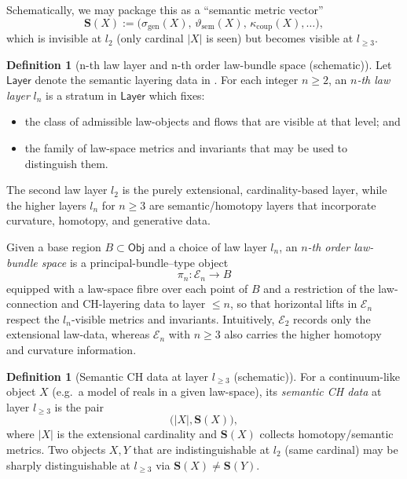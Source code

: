 \documentclass[11pt]{book}
\theoremstyle{plain}
\theoremstyle{definition}
\newtheorem{definition}[theorem]{Definition} \theoremstyle{remark}
\begin{document}
Schematically, we may package this as a “semantic metric vector”
\[
  \mathbf{S}(X)
  :=
  \bigl(
    \sigma_{\mathrm{gen}}(X),\,
    \vartheta_{\mathrm{sem}}(X),\,
    \kappa_{\mathrm{coup}}(X),\dots
  \bigr),
\]
which is invisible at $l_2$ (only cardinal $|X|$ is seen) but becomes
visible at $l_{\ge3}$.

\begin{definition}[n-th law layer and n-th order law-bundle space (schematic)]
  Let $\mathsf{Layer}$ denote the semantic layering data in \GZGMS.
  For each integer $n\ge2$, an \emph{$n$-th law layer} $l_n$ is a
  stratum in $\mathsf{Layer}$ which fixes:
  \begin{itemize}
    \item the class of admissible law-objects and flows that are
          visible at that level; and
    \item the family of law-space metrics and invariants that may be
          used to distinguish them.
  \end{itemize}
  The second law layer $l_2$ is the purely extensional,
  cardinality-based layer, while the higher layers $l_n$ for $n\ge3$
  are semantic/homotopy layers that incorporate curvature, homotopy,
  and generative data.

  Given a base region $B\subset\mathsf{Obj}$ and a choice of law
  layer $l_n$, an \emph{$n$-th order law-bundle space} is a
  principal-bundle--type object
  \[
    \pi_n : \mathcal{E}_n \to B
  \]
  equipped with a law-space fibre over each point of $B$ and a
  restriction of the law-connection and CH-layering data to layer
  $\le n$, so that horizontal lifts in $\mathcal{E}_n$ respect the
  $l_n$-visible metrics and invariants. Intuitively, $\mathcal{E}_2$
  records only the extensional law-data, whereas $\mathcal{E}_n$ with
  $n\ge3$ also carries the higher homotopy and curvature information.
\end{definition}


\begin{definition}[Semantic CH data at layer $l_{\ge3}$ (schematic)]
  For a continuum-like object $X$ (e.g.\ a model of reals in a given
  law-space), its \emph{semantic CH data} at layer $l_{\ge3}$ is the
  pair
  \[
    \bigl(|X|,\mathbf{S}(X)\bigr),
  \]
  where $|X|$ is the extensional cardinality and $\mathbf{S}(X)$
  collects homotopy/semantic metrics. Two objects $X,Y$ that are
  indistinguish\-able at $l_2$ (same cardinal) may be sharply
  distinguishable at $l_{\ge3}$ via $\mathbf{S}(X)\neq\mathbf{S}(Y)$.
\end{definition}
\end{document}

